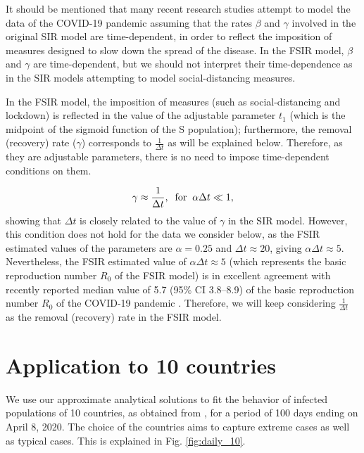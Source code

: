 \documentclass[aps,preprint]{revtex4}
\begin{document}
It should be mentioned that many recent research studies attempt to model the data of the COVID-19 pandemic 
assuming that the rates $\beta$ and $\gamma$ involved in the original SIR 
model are time-dependent, in order to reflect the imposition of measures designed to slow 
down the spread of the disease. In the FSIR model, $\beta$ and $\gamma$ are time-dependent, but we should not interpret their time-dependence as in the SIR models attempting to model social-distancing measures.

In the FSIR model, the imposition of measures (such as social-distancing and lockdown) is reflected in the value of the adjustable parameter $t_1$ (which is the midpoint of the sigmoid function of the S population); furthermore, the removal (recovery) rate ($\gamma$) corresponds to $\frac {1}{\Delta t}$ as will be explained below. Therefore, as they are adjustable parameters, there is no need to impose time-dependent conditions on them.

$$\gamma \approx \frac{1}{\Delta t}, \; \; {\rm for} \; \; \alpha \Delta t \ll 1,$$
showing that $\Delta t$ is closely related to the value of $\gamma$ in the SIR model. 
However, this condition does not hold for the data we consider below, as the FSIR estimated values
of the parameters are $\alpha=0.25$ and $\Delta t \approx 20$, 
giving $\alpha \Delta t \approx 5$. Nevertheless, the FSIR estimated value of $\alpha \Delta t \approx 5$ (which represents the basic reproduction number $R_0$ of the FSIR model) is in excellent agreement with recently reported median value of 5.7 (95\% CI 3.8–8.9) of the basic reproduction number $R_0$ of the COVID-19 pandemic \cite{Sanche_2020}. Therefore, we will keep considering $\frac {1}{\Delta t}$ as the removal (recovery) rate in the FSIR model.  
 

\section{Application to 10 countries}

We use our approximate analytical solutions to fit the behavior of 
infected populations of 10 countries, as obtained from \cite{ECDC_source}, 
for a period of 100 days ending on April 8, 2020.  
The choice of the countries aims to capture extreme cases as well as 
typical cases.  This is explained in Fig. \ref{fig:daily_10}.
\end{document}
